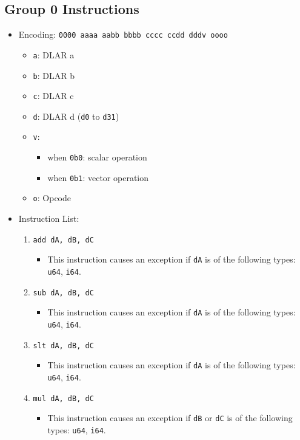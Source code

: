 \documentclass{article}
\begin{document}
	\subsection{Group 0 Instructions}
		\begin{itemize}
		\item Encoding: \texttt{0000 aaaa aabb bbbb  cccc ccdd dddv oooo}
			\begin{itemize}
			\item \texttt{a}:  DLAR a
			\item \texttt{b}:  DLAR b
			\item \texttt{c}:  DLAR c
			\item \texttt{d}:  DLAR d (\texttt{d0} to \texttt{d31})
			\item \texttt{v}:
				\begin{itemize}
				\item when \texttt{0b0}:  scalar operation
				\item when \texttt{0b1}:  vector operation
				\end{itemize}
			\item \texttt{o}:  Opcode
			\end{itemize}
		\item Instruction List:
			\begin{enumerate}
			\item \texttt{add dA, dB, dC}
				\begin{itemize}
				\item This instruction causes an exception if \texttt{dA}
				is of the following types:  \texttt{u64}, \texttt{i64}.
				\end{itemize}
			\item \texttt{sub dA, dB, dC}
				\begin{itemize}
				\item This instruction causes an exception if \texttt{dA}
				is of the following types:  \texttt{u64}, \texttt{i64}.
				\end{itemize}
			\item \texttt{slt dA, dB, dC}
				\begin{itemize}
				\item This instruction causes an exception if \texttt{dA}
				is of the following types:  \texttt{u64}, \texttt{i64}.
				\end{itemize}
			\item \texttt{mul dA, dB, dC}
				\begin{itemize}
				\item This instruction causes an exception if \texttt{dB}
				or \texttt{dC} is of the following types:  \texttt{u64},
				\texttt{i64}.
				\end{itemize}


\end{enumerate}
\end{itemize}
\end{document}
